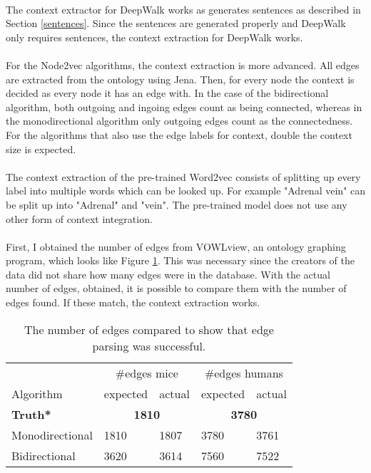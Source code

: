 \documentclass{article}
\begin{document}
  \paragraph{}
  The context extractor for DeepWalk works as generates sentences as described in Section \ref{sentences}. Since the sentences are generated properly and DeepWalk only requires sentences, the context extraction for DeepWalk works.
  \paragraph{}
  For the Node2vec algorithms, the context extraction is more advanced. All edges are extracted from the ontology using Jena. Then, for every node the context is decided as every node it has an edge with. In the case of the bidirectional algorithm, both outgoing and ingoing edges count as being connected, whereas in the monodirectional algorithm only outgoing edges count as the connectedness. For the algorithms that also use the edge labels for context, double the context size is expected.
  \paragraph{}
  The context extraction of the pre-trained Word2vec consists of splitting up every label into multiple words which can be looked up. For example "Adrenal vein" can be split up into "Adrenal" and "vein".
  The pre-trained model does not use any other form of context integration.
  \paragraph{}
  First, I obtained the number of edges from VOWLview\cite{vowlview}, an ontology graphing program, which looks like Figure \ref{vowlfig}. This was necessary since the creators of the data did not share how many edges were in the database. With the actual number of edges, obtained, it is possible to compare them with the number of edges found. If these match, the context extraction works.
  
  \begin{figure}
  \caption[]{}
  \label{vowlfig}
  \end{figure}
  
  \begin{table}[H]
  \caption[Edge comparison]{The number of edges compared to show that edge parsing was successful.}
  \label{edgecounts}
  \begin{tabular}{l|ll|ll}  
  & \multicolumn{2}{c}{\#edges mice} & \multicolumn{2}{c|}{\#edges humans}\\
  Algorithm & expected & actual & expected & actual\\
  \hline
  \textbf{Truth*} & \multicolumn{2}{c|}{\textbf{1810}} & \multicolumn{2}{c}{\textbf{3780}} \\
  Monodirectional & 1810 & 1807 & 3780 & 3761\\
  Bidirectional & 3620 & 3614 & 7560 & 7522\\
  \end{tabular}
  \end{table}
\end{document}
